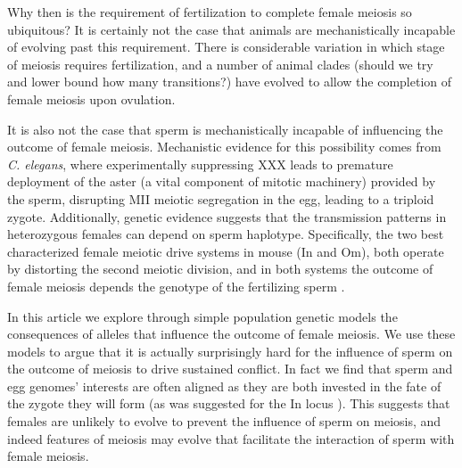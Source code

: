 \documentclass[12pt,letterpaper]{article}
\begin{document}
Why then is the requirement of fertilization to complete female meiosis so ubiquitous? 
It is certainly not the case that animals are mechanistically incapable of evolving past this requirement.
There is considerable variation in which stage of meiosis requires fertilization, and 
a number of animal clades (should we try and lower bound how many transitions?) have evolved
to allow the completion of female meiosis upon ovulation. 

It is also not the case that sperm is mechanistically incapable of influencing the outcome of female meiosis.
Mechanistic evidence for this possibility comes from \emph{C. elegans}, where experimentally suppressing XXX leads to premature deployment of the aster (a vital component of mitotic machinery) provided by the sperm, disrupting MII meiotic segregation in the egg, leading to a triploid zygote. 
Additionally, genetic evidence suggests that the transmission patterns in heterozygous females can depend on sperm haplotype. 
Specifically, the two best characterized female meiotic drive systems in mouse (In and Om), both operate by distorting the second meiotic division, 
and in both systems the outcome of female meiosis depends the genotype of the fertilizing sperm \citep{Agulnik1993,Wu2005}. 


In this article we explore through simple population genetic models the consequences of alleles that influence the outcome 
of female meiosis. 
We use these models to argue that it is actually surprisingly hard for the influence of
sperm on the outcome of meiosis to drive sustained conflict. In fact we find that sperm and egg 
genomes' interests are often aligned as they are both invested in the fate of the zygote they will form (as was suggested for the In locus \citep{Pomiankowski1993}).
This suggests that females are unlikely to evolve to prevent the influence of sperm on meiosis,
and indeed features of meiosis may evolve that facilitate the interaction of sperm with female meiosis. 
\end{document}
